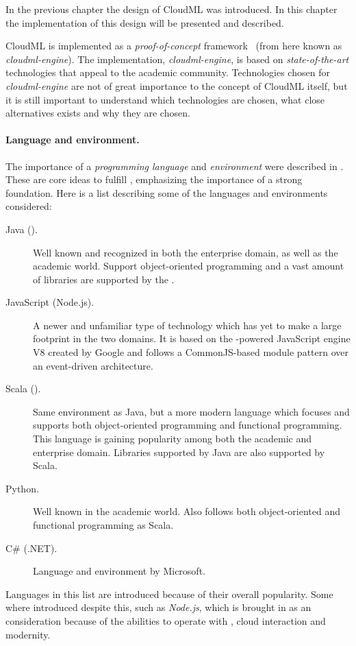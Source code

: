 
In the previous chapter the design of CloudML was introduced.
In this chapter the implementation of this design will be presented and described.


CloudML is implemented as a \emph{proof-of-concept} framework~\cite{cloudml-engine}
(from here known as \emph{cloudml-engine}). 
The implementation, \emph{cloudml-engine}, 
is based on \emph{state-of-the-art} technologies that appeal to the academic community.
Technologies chosen for \emph{cloudml-engine} are not of great importance to the concept of CloudML itself,
but it is still important to understand which technologies are chosen, what close alternatives exists
and why they are chosen.

\paragraph{Language and environment.} 

The importance of a \emph{programming language} and \emph{environment} were
described in .
These are core ideas to fulfill , emphasizing the importance of a strong foundation.
Here is a list describing some of the languages and environments considered:
\begin{description}
  \item[Java ().] Well known and recognized in both the enterprise domain, as well as the academic world.
    Support object-oriented programming and a vast amount of libraries are supported by the .
  \item[JavaScript (Node.js).] A newer and unfamiliar type of technology which has yet to 
    make a large footprint in the two domains. 
    It is based on the -powered JavaScript engine V8 created by Google and follows a 
    CommonJS-based module pattern over an event-driven architecture.
  \item[Scala ().] Same environment as Java, 
    but a more modern language which focuses and supports both 
    object-oriented programming and functional programming.
    This language is gaining popularity among both the academic and enterprise domain.
    Libraries supported by Java are also supported by Scala.
  \item[Python.] Well known in the academic world. Also follows both object-oriented and functional programming as
    Scala.
  \item[C\# (.NET).] Language and environment by Microsoft.
\end{description}
Languages in this list are introduced because of their overall popularity.
Some where introduced despite this, such as \emph{Node.js}, 
which is brought in as an consideration because of the abilities to operate
with , cloud interaction and modernity.

